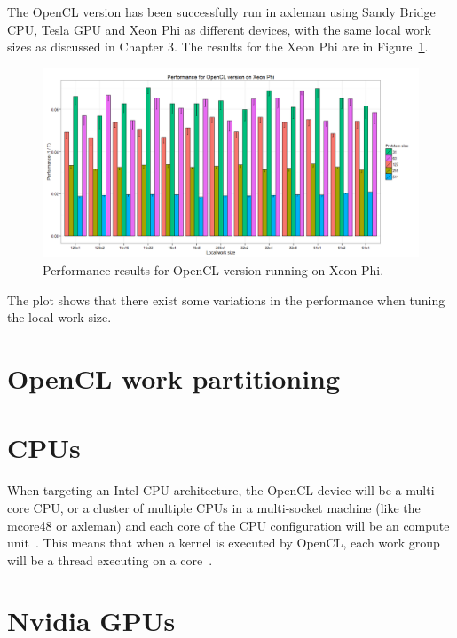 The OpenCL version has been successfully run in axleman using Sandy Bridge CPU, Tesla GPU and Xeon Phi as different devices, with the same local work sizes as discussed in Chapter 3. The results for the Xeon Phi are in Figure~\ref{f:phi}.

\begin{figure}[!h]
\begin{center}
\centerline{\includegraphics[width=6in]{img/phi}}
\caption{Performance results for OpenCL version running on Xeon Phi.}
\label{f:phi}
\end{center}
\end{figure}

The plot shows that there exist some variations in the performance when tuning the local work size.


\section{OpenCL work partitioning}


\section{CPUs}

When targeting an Intel CPU architecture, the OpenCL device will be a multi-core CPU, or a cluster of multiple CPUs in a multi-socket machine (like the mcore48 or axleman) and each core of the CPU configuration will be an compute unit~\cite{Intel2014}. This means that when a kernel is executed by OpenCL, each work group will be a thread executing on a core~\cite{Sych2014}.



\section{Nvidia GPUs}



